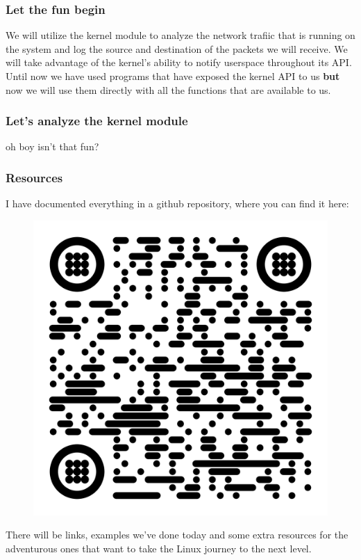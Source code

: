 \documentclass{beamer}
\begin{document}
\begin{frame}
    \frametitle{Let the fun begin}
    \small
    We will utilize the kernel module to analyze the network trafiic that is
    running on the system and log the source and destination of the packets
    we will receive.
    \newline
    \newline
    We will take advantage of the kernel's ability to notify userspace
    throughout its API.
    \newline
    \newline
    Until now we have used programs that have exposed the kernel API to us
    \textbf{but} now we will use them directly with all the functions
    that are available to us.
\end{frame}

\begin{frame}
    \frametitle{Let's analyze the kernel module}
    \small oh boy isn't that fun?
\end{frame}

\begin{frame}
    \frametitle{Resources}
    \small
    I have documented everything in a github repository, where you can find it here:
    \begin{figure}

        \includegraphics[width=0.4\linewidth]{qr-github}

        \label{fig:qr-github}

    \end{figure}
    \centering \small There will be links, examples we've done today and some
    extra resources for the adventurous ones that want to take the Linux
    journey to the next level.

\end{frame}
\end{document}
